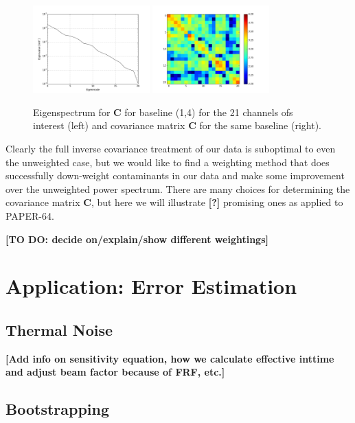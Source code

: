 \documentclass[preprint2,numberedappendix,tighten,twocolappendix]{aastex6}  %
\newcommand{\cc}[1]{{\color{purple} \textbf{[#1]}}}
\begin{document}
\begin{figure}
	\centering
	\includegraphics[width=0.4\textwidth]{plots/eigenspectrum.png}
	\includegraphics[width=0.4\textwidth]{plots/covariance.png}
	\caption{Eigenspectrum for $\textbf{C}$ for baseline (1,4) for the 21 channels ofs interest (left) and covariance matrix $\textbf{C}$ for the same baseline (right).}
	\label{fig:eigenspectrum}
\end{figure}

Clearly the full inverse covariance treatment of our data is suboptimal to even the unweighted case, but we would like to find a weighting method that does successfully down-weight contaminants in our data and make some improvement over the unweighted power spectrum. There are many choices for determining the covariance matrix $\textbf{C}$, but here we will illustrate \cc{?} promising ones as applied to PAPER-64.

\cc{TO DO: decide on/explain/show different weightings}

\section{Application: Error Estimation}
\label{sec:Error}

\subsection{Thermal Noise}

\cc{Add info on sensitivity equation, how we calculate effective inttime and adjust beam factor because of FRF, etc.}

\subsection{Bootstrapping}
\end{document}
